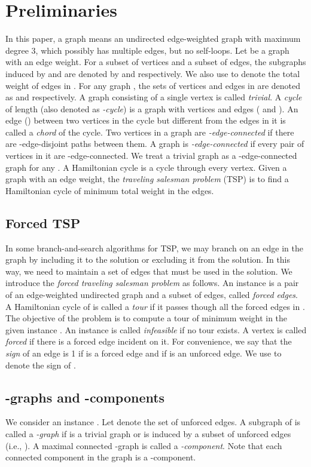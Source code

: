 \documentclass[runningheads]{llncs}
\begin{document}
\section{Preliminaries}\label{sec:prelim}

In this paper, a graph means an undirected edge-weighted graph with maximum degree 3,
which possibly has multiple edges, but no self-loops.
Let  be a graph with an edge weight.
For a subset  of vertices and a subset  of edges,
the subgraphs induced by  and  are denoted by  and  respectively. We also use   to denote the total weight of edges in .
For any graph , the sets of vertices
and edges in  are denoted as  and  respectively.
A graph consisting of a single vertex is called {\em trivial}.
A \emph{cycle} of length  (also denoted as {\em -cycle}) is a graph with  vertices  and  edges  ( and ). An edge  () between two vertices in the cycle but different from the  edges in it
is called a {\em chord} of the cycle.
Two vertices in a graph are
{\em -edge-connected} if there are -edge-disjoint paths between them. A graph is {\em -edge-connected} if every pair of vertices in it are -edge-connected.
We treat a trivial graph as a -edge-connected graph for any .
A Hamiltonian cycle is a cycle through every vertex. Given a graph with an edge weight,
the \emph{traveling salesman problem} (TSP) is to find a Hamiltonian cycle of minimum total weight in the edges.

\subsection{Forced TSP}
In some branch-and-search algorithms for TSP, we may branch on an edge in the graph by including it to the solution
or excluding it from the solution. In this way, we need to maintain a set of edges that must be used in the solution.
We introduce the \emph{forced traveling salesman problem} as follows. An instance is a pair  of an edge-weighted undirected graph
 and
a subset  of edges, called {\em forced edges}.
A Hamiltonian cycle of  is called a {\em tour}
if it passes though all the forced edges in . The objective of the problem is to compute a tour of minimum weight in
the given instance . An instance is called {\em infeasible} if no tour exists. A vertex is called \emph{forced} if there is a forced edge incident on it. For convenience, we say that the \emph{sign} of an edge  is 1 if  is a forced edge and  if  is an unforced edge. We use  to denote the sign of .


\subsection{-graphs and -components}
We consider an instance . Let  denote the set of unforced edges.
A subgraph  of  is called a \emph{-graph} if  is a trivial graph or  is
induced by a subset  of unforced edges (i.e., ). A maximal connected -graph is called a \emph{-component}.
Note that each connected component in the graph  is a -component.
\end{document}
